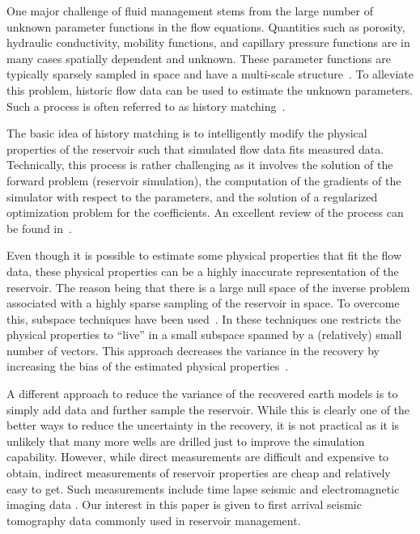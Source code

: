 \documentclass[english]{siamltex}
\begin{document}
One major challenge of fluid management stems from the large number
of unknown parameter functions in the flow equations.
Quantities such as porosity, hydraulic conductivity,
mobility functions, and capillary pressure functions
are in many cases spatially dependent and  unknown.
These parameter functions are typically sparsely sampled 
 in space and have a  multi-scale 
structure~\cite{WangTartakovsky13}. To alleviate this problem, historic
flow data can be used to estimate the unknown
parameters. Such a process is often referred to as history
matching~\cite{DeanChen2011,OliverBook2008}.

The basic idea of history matching is to intelligently 
modify the physical properties of the reservoir such 
that simulated flow data fits measured data. Technically,
this process is rather challenging as it involves 
the solution of the forward problem (reservoir simulation),
the computation of the gradients of the simulator with
respect to the parameters, and the solution of a regularized
optimization problem for the coefficients. An excellent
review of the process can be found in~\cite{DeanChen2011}.

Even though it is possible to estimate
some physical properties that fit the flow data,
these physical properties can be a highly inaccurate
representation of the reservoir.
The reason being that there is a large null space of
 the inverse problem associated
with a highly sparse sampling of the reservoir in space.
To overcome this, subspace techniques have been
used~\cite{DeanChen2011,GerritsenDurlofsky2005,SarmaDurlofskyAziz2007,Oliver01}.
In these techniques one restricts
the physical properties to ``live'' in a small subspace
spanned by a (relatively) small number of vectors.
This approach decreases the variance in the recovery
by increasing the bias of the estimated physical 
properties~\cite{tensiam}.

A different approach to reduce the variance of the
recovered earth models is to simply add data and further
sample the reservoir. While this
is clearly one of the better ways to reduce the uncertainty
in the recovery, it is not practical as it is
unlikely that many more wells are drilled just to improve
the simulation capability.
However, while direct measurements are difficult
and expensive to obtain, indirect measurements
of reservoir properties are cheap and relatively
easy to get. Such measurements include time lapse
seismic and electromagnetic imaging data 
\cite{Lumley2001,VascoEtAl2004}. 
Our interest in this paper is given to first arrival
seismic tomography data commonly used in reservoir management.
\end{document}
